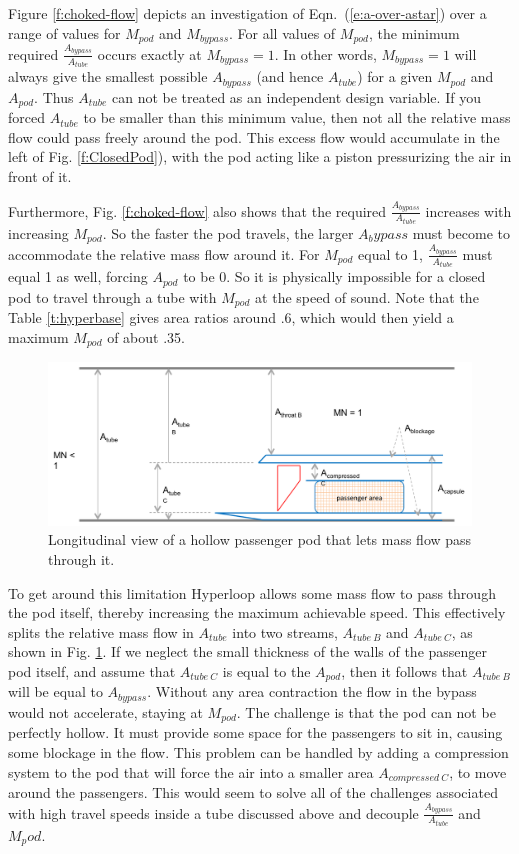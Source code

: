 \documentclass[heading.tex]{subfiles}
\begin{document}
Figure \ref{f:choked-flow} depicts an investigation of Eqn.~(\ref{e:a-over-astar}) over a range of values for $M_{pod}$ and $M_{bypass}$. 
For all values of $M_{pod}$, the minimum required $\frac{A_{bypass}}{A_{tube}}$ occurs exactly at $M_{bypass}=1$. In other words, 
$M_{bypass}=1$ will always give the smallest possible $A_{bypass}$ (and hence $A_{tube}$) for a given 
$M_{pod}$ and $A_{pod}$. Thus $A_{tube}$ can not be treated as an independent design variable. If you forced $A_{tube}$ to be
smaller than this minimum value, then not all the relative mass flow could pass freely around the pod. This excess 
flow would accumulate in the left of Fig. \ref{f:ClosedPod}), with the pod acting like a piston pressurizing the 
air in front of it. 

Furthermore, Fig. \ref{f:choked-flow} also shows that the required $\frac{A_{bypass}}{A_{tube}}$ 
increases with increasing $M_{pod}$. So the faster the pod travels, the larger $A_bypass$ 
must become to accommodate the relative mass flow around it. For $M_{pod}$ equal to 1, $\frac{A_{bypass}}{A_{tube}}$ must 
equal 1 as well, forcing $A_{pod}$ to be 0. So it is physically impossible for a closed pod to travel through a 
tube with $M_{pod}$ at the speed of sound. Note that the Table \ref{t:hyperbase} gives area ratios around .6, 
which would then yield a maximum $M_{pod}$ of about .35. 

\begin{figure}[hbtp]
\centering
\includegraphics[width=.85\textwidth]{images/hollowCapsule}
\caption{Longitudinal view of a hollow passenger pod that lets mass flow pass through it.}
\label{f:hollowPod}
\end{figure}

To get around this limitation Hyperloop allows some mass flow to pass through the pod itself, thereby increasing
the maximum achievable speed. This effectively splits the relative mass flow in $A_{tube}$ into two streams, 
$A_{tube\ B}$ and  $A_{tube\ C}$, as shown in Fig. \ref{f:hollowPod}. If we neglect the small thickness of the walls of
the passenger pod itself, and assume that $A_{tube\ C}$ is equal to the $A_{pod}$, then it follows that $A_{tube\ B}$ 
will be equal to $A_{bypass}$. Without any area contraction the flow in the bypass would not accelerate, staying 
at $M_{pod}$. The challenge is that the pod can not be perfectly hollow. It must provide some space for the passengers
to sit in, causing some blockage in the flow. This problem can be handled by adding a compression system to the 
pod that will force the air into a smaller area $A_{compressed\ C}$, to move around the passengers. This would 
seem to solve all of the challenges associated with high travel speeds inside a tube discussed above and decouple 
$\frac{A_{bypass}}{A_{tube}}$ and ${M_pod}$.
\end{document}
